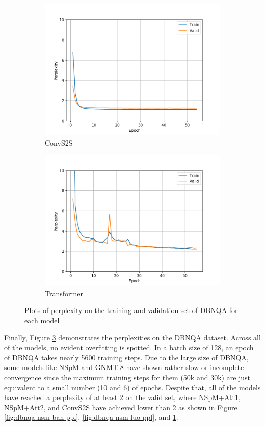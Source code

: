 \begin{figure}[h]
\begin{subfigure}{0.3\textwidth}
\includegraphics[width=\textwidth]{../results/dbnqa1/run1/fconv_wmt_en_de/ppls.png} 
\caption{ConvS2S}
\label{fig:dbnqa convs2s ppl}
\end{subfigure}
\hfill
\begin{subfigure}{0.3\textwidth}
\includegraphics[width=\textwidth]{../results/dbnqa1/run1/transformer_iwslt_de_en/ppls.png}
\caption{Transformer}
\label{fig:dbnqa transformer ppl}
\end{subfigure}
\hfill
\caption{Plots of perplexity on the training and validation set of DBNQA for each model}
\label{fig:dbnqa ppls}
\end{figure}

Finally, Figure \ref{fig:dbnqa ppls} demonstrates the perplexities on the DBNQA dataset. Across all of the models, no evident overfitting is spotted. In a batch size of 128, an epoch of DBNQA takes nearly 5600 training steps. Due to the large size of DBNQA, some models like NSpM and GNMT-8 have shown rather slow or incomplete convergence since the maximum training steps for them (50k and 30k) are just equivalent to a small number (10 and 6) of epochs. Despite that, all of the models have reached a perplexity of at least 2 on the valid set, where NSpM+Att1, NSpM+Att2, and ConvS2S have achieved lower than 2 as shown in Figure \ref{fig:dbnqa nsm-bah ppl}, \ref{fig:dbnqa nsm-luo ppl}, and \ref{fig:dbnqa convs2s ppl}.

